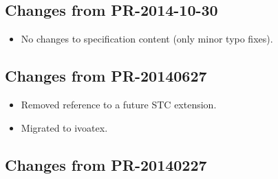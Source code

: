 \documentclass[11pt,a4paper]{ivoa}
\begin{document}
\subsection{Changes from PR-2014-10-30}

\begin{itemize}
\item No changes to specification content (only minor typo fixes).
\end{itemize}


\subsection{Changes from PR-20140627}

\begin{itemize}
\item Removed reference to a future STC extension.
\item Migrated to ivoatex.
\end{itemize}

\subsection{Changes from PR-20140227}

\label{changes-20140227}
\end{document}
